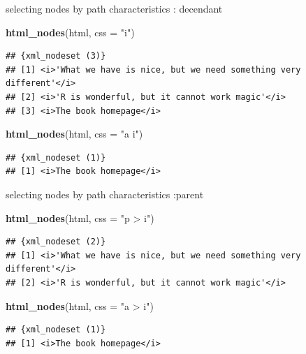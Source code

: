 \documentclass[ignorenonframetext,]{beamer}
\newenvironment{Shaded}{\begin{snugshade}}{\end{snugshade}}
\newcommand{\KeywordTok}[1]{\textcolor[rgb]{0.13,0.29,0.53}{\textbf{{#1}}}}
\newcommand{\DataTypeTok}[1]{\textcolor[rgb]{0.13,0.29,0.53}{{#1}}}
\newcommand{\StringTok}[1]{\textcolor[rgb]{0.31,0.60,0.02}{{#1}}}
\newcommand{\NormalTok}[1]{{#1}}
\begin{document}
\begin{frame}[fragile]{selecting nodes by path characteristics :
decendant}

\begin{Shaded}
\begin{Highlighting}[]
\KeywordTok{html_nodes}\NormalTok{(html, }\DataTypeTok{css =} \StringTok{"i"}\NormalTok{)}
\end{Highlighting}
\end{Shaded}

\begin{verbatim}
## {xml_nodeset (3)}
## [1] <i>'What we have is nice, but we need something very different'</i>
## [2] <i>'R is wonderful, but it cannot work magic'</i>
## [3] <i>The book homepage</i>
\end{verbatim}

\begin{Shaded}
\begin{Highlighting}[]
\KeywordTok{html_nodes}\NormalTok{(html, }\DataTypeTok{css =} \StringTok{"a i"}\NormalTok{)}
\end{Highlighting}
\end{Shaded}

\begin{verbatim}
## {xml_nodeset (1)}
## [1] <i>The book homepage</i>
\end{verbatim}

\end{frame}

\begin{frame}[fragile]{selecting nodes by path characteristics :parent}

\begin{Shaded}
\begin{Highlighting}[]
\KeywordTok{html_nodes}\NormalTok{(html, }\DataTypeTok{css =} \StringTok{"p > i"}\NormalTok{)}
\end{Highlighting}
\end{Shaded}

\begin{verbatim}
## {xml_nodeset (2)}
## [1] <i>'What we have is nice, but we need something very different'</i>
## [2] <i>'R is wonderful, but it cannot work magic'</i>
\end{verbatim}

\begin{Shaded}
\begin{Highlighting}[]
\KeywordTok{html_nodes}\NormalTok{(html, }\DataTypeTok{css =} \StringTok{"a > i"}\NormalTok{)}
\end{Highlighting}
\end{Shaded}

\begin{verbatim}
## {xml_nodeset (1)}
## [1] <i>The book homepage</i>
\end{verbatim}

\end{frame}
\end{document}

